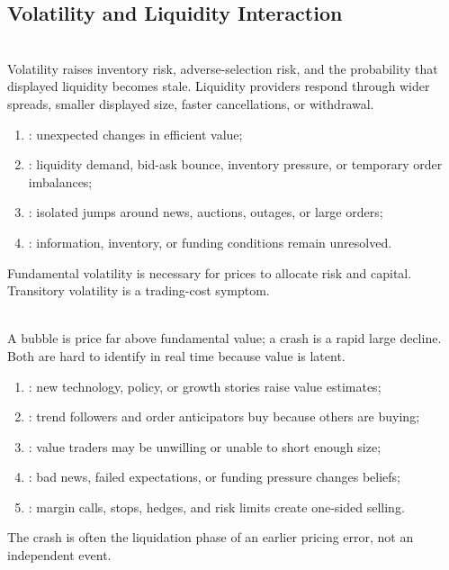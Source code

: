 \subsection{Volatility and Liquidity Interaction}

\begin{principle} \\
Volatility raises inventory risk, adverse-selection risk, and the probability that displayed liquidity becomes stale. Liquidity providers respond through wider spreads, smaller displayed size, faster cancellations, or withdrawal.
\end{principle}

\begin{taxonomy} 
\begin{enumerate}[label=\roman*.]
\setlength{\itemsep}{0pt}
\item {}: unexpected changes in efficient value;
\item {}: liquidity demand, bid-ask bounce, inventory pressure, or temporary order imbalances;
\item {}: isolated jumps around news, auctions, outages, or large orders;
\item {}: information, inventory, or funding conditions remain unresolved.
\end{enumerate}
Fundamental volatility is necessary for prices to allocate risk and capital.\\
Transitory volatility is a trading-cost symptom.
\end{taxonomy}

\begin{definition} \\
A bubble is price far above fundamental value; a crash is a rapid large decline. Both are hard to identify in real time because value is latent.
\end{definition}

\begin{taxonomy} 
\begin{enumerate}[label=\roman*.]
\setlength{\itemsep}{0pt}
\item {}: new technology, policy, or growth stories raise value estimates;
\item {}: trend followers and order anticipators buy because others are buying;
\item {}: value traders may be unwilling or unable to short enough size;
\item {}: bad news, failed expectations, or funding pressure changes beliefs;
\item {}: margin calls, stops, hedges, and risk limits create one-sided selling.
\end{enumerate}
The crash is often the liquidation phase of an earlier pricing error, not an independent event.
\end{taxonomy}

